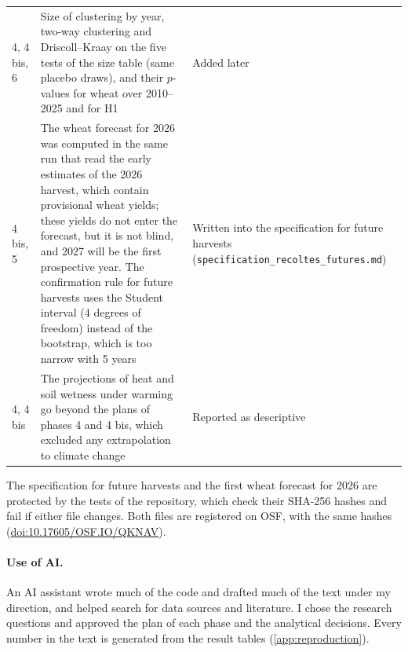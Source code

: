 {\begin{longtable}{>{\raggedright}p{1.3cm}>{\raggedright}p{7.3cm}>{\raggedright\arraybackslash}p{4.6cm}}
4, 4 bis, 6 & Size of clustering by year, two-way clustering and Driscoll--Kraay on the five tests of the size table (same placebo draws), and their $p$-values for wheat over 2010--2025 and for H1 & Added later \\
4 bis, 5 & The wheat forecast for 2026 was computed in the same run that read the early estimates of the 2026 harvest, which contain provisional wheat yields; these yields do not enter the forecast, but it is not blind, and 2027 will be the first prospective year. The confirmation rule for future harvests uses the Student interval (4 degrees of freedom) instead of the bootstrap, which is too narrow with 5 years & Written into the specification for future harvests (\texttt{specification\_\allowbreak recoltes\_\allowbreak futures.md}) \\
4, 4 bis & The projections of heat and soil wetness under warming go beyond the plans of phases 4 and 4 bis, which excluded any extrapolation to climate change & Reported as descriptive \\
\bottomrule
\end{longtable}
}

The specification for future harvests and the first wheat forecast for 2026 are protected by the tests of the repository, which check their SHA-256 hashes and fail if either file changes. Both files are registered on OSF, with the same hashes (\href{https://doi.org/10.17605/OSF.IO/QKNAV}{doi:10.17605/OSF.IO/QKNAV}).

\paragraph{Use of AI.} An AI assistant wrote much of the code and drafted much of the text under my direction, and helped search for data sources and literature. I chose the research questions and approved the plan of each phase and the analytical decisions. Every number in the text is generated from the result tables (\cref{app:reproduction}).
